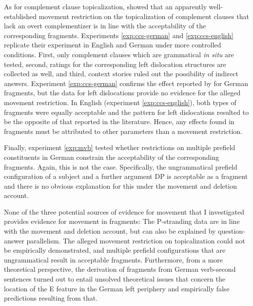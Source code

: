 As for complement clause topicalization, \citet{merchant.etal2013} showed that an apparently well-established movement restriction on the topicalization of complement clauses that lack an overt complementizer is in line with the acceptability of the corresponding fragments. Experiments \ref{exp:ccs-german} and \ref{exp:ccs-english} replicate their experiment in English and German under more controlled conditions. First, only complement clauses which are grammatical \textit{in situ} are tested, second, ratings for the corresponding left dislocation structures are collected as well, and third, context stories ruled out the possibility of indirect answers. Experiment \ref{exp:ccs-german} confirms the effect reported by \citet{merchant.etal2013} for German fragments, but the data for left dislocations provide no evidence for the alleged movement restriction. In English (experiment \ref{exp:ccs-english}), both types of fragments were equally acceptable and the pattern for left dislocations resulted to be the opposite of that reported in the literature. Hence, any effects found in fragments must be attributed to other parameters than a movement restriction.

Finally, experiment \ref{exp:mvb} tested whether restrictions on multiple prefield constituents in German constrain the acceptability of the corresponding fragments. Again, this is not the case. Specifically, the ungrammatical prefield configuration of a subject and a further argument DP is acceptable as a fragment and there is no obvious explanation for this under the movement and deletion account.

None of the three potential sources of evidence for movement that I investigated provides evidence for movement in fragments: The P-stranding data are in line with the movement and deletion account, but can also be explained by question-answer parallelism. The alleged movement restriction on topicalization could not be empirically demonstrated, and multiple prefield configurations that are ungrammatical result in acceptable fragments. Furthermore, from a more theoretical perspective, the derivation of fragments from German verb-second sentences turned out to entail unsolved theoretical issues that concern the location of the E feature in the German left periphery and empirically false predictions resulting from that.

